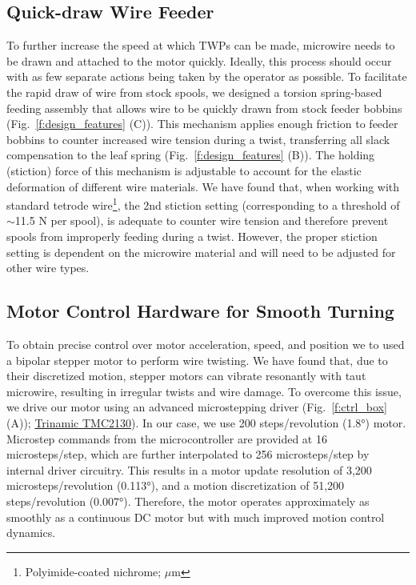 \documentclass[11pt,a4paper]{article}
\begin{document}
\subsection{Quick-draw Wire Feeder}
To further increase the speed at which TWPs can be made, microwire needs to be
drawn and attached to the motor quickly. Ideally, this process should occur
with as few separate actions being taken by the operator as possible. To
facilitate the rapid draw of wire from stock spools, we designed a torsion
spring-based feeding assembly that allows wire to be quickly drawn from stock
feeder bobbins (Fig.~\ref{f:design_features} (C)).
This mechanism applies enough friction to feeder bobbins to counter increased
wire tension during a twist, transferring all slack compensation to the leaf
spring (Fig.~\ref{f:design_features} (B)). The holding (stiction) force of this
mechanism is adjustable to account for the elastic deformation of different
wire materials. We have found that, when working with standard tetrode
wire\footnote{Polyimide-coated nichrome; $\mu$m}, the 2nd stiction
setting (corresponding to a threshold of $\sim$11.5 N per spool), is adequate
to counter wire tension and therefore prevent spools from improperly feeding
during a twist. However, the proper stiction setting is dependent on the
microwire material and will need to be adjusted for other wire types.

\subsection{Motor Control Hardware for Smooth Turning}
To obtain precise control over motor acceleration, speed, and position we
to used a bipolar stepper motor to perform wire twisting. We have found that,
due to their discretized motion, stepper motors can vibrate resonantly with
taut microwire, resulting in irregular twists and wire damage. To overcome
this issue, we drive our motor using an advanced microstepping driver
(Fig.~\ref{f:ctrl_box} (A));
\href{https://www.trinamic.com/products/integrated-circuits/details/tmc2100/}{Trinamic
TMC2130}). In our case, we use 200 steps/revolution (\ang{1.8})
motor. Microstep commands from the microcontroller are provided at 16
microsteps/step, which are further interpolated to 256 microsteps/step by
internal driver circuitry. This results in a motor update resolution of 3,200
microsteps/revolution (\ang{0.113}), and a motion discretization of 51,200
steps/revolution (\ang{0.007}). Therefore, the motor operates approximately as
smoothly as a continuous DC motor but with much improved motion control
dynamics.
\end{document}
